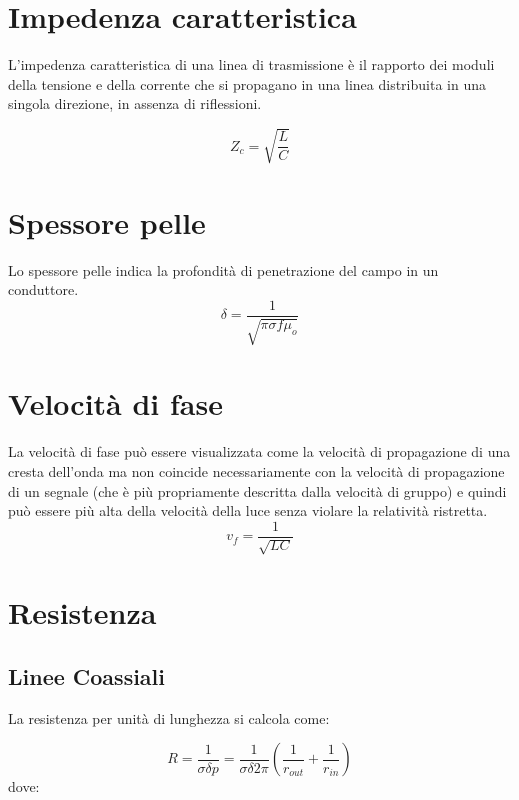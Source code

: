 	\section{Impedenza caratteristica}

			L'impedenza caratteristica di una linea di trasmissione è il rapporto dei moduli della tensione e della corrente che si propagano in una linea distribuita in una singola direzione, in assenza di riflessioni.

			\begin{equation}
				Z_c=\sqrt{\frac{L}{C}}
			\end{equation}

	\section{Spessore pelle}
			Lo spessore pelle indica la profondità di penetrazione del campo in un conduttore.
			\begin{equation}
			\delta=\frac{1}{	\sqrt{\pi \sigma f \mu_o}}
			\end{equation}

	\section{Velocità di fase}
			 La velocità di fase può essere visualizzata come la velocità di propagazione di una cresta dell'onda ma non coincide necessariamente con la velocità di propagazione di un segnale (che è più propriamente descritta dalla velocità di gruppo) e quindi può essere più alta della velocità della luce senza violare la relatività ristretta.
			\begin{equation}
				v_f=\frac{1}{\sqrt{LC}}
			\end{equation}

	\section{Resistenza}

		\subsection{Linee Coassiali}

			La resistenza per unità di lunghezza si calcola come:

			\begin{equation}R=\frac{1}{\sigma \delta p}=\frac{1}{\sigma \delta 2 \pi}(\frac{1}{r_{out}}+\frac{1}{r_{in}})\end{equation}
			dove:
			

